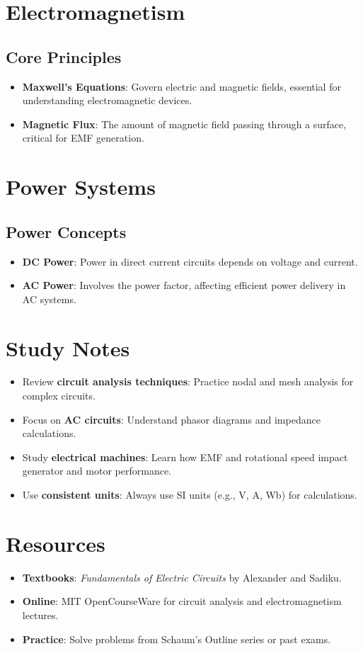 \documentclass[12pt]{article}
\newcommand{\concept}[1]{\textbf{#1}}
\begin{document}
\section{Electromagnetism}
\subsection{Core Principles}
\begin{itemize}
    \item \concept{Maxwell's Equations}: Govern electric and magnetic fields, essential for understanding electromagnetic devices.
    \item \concept{Magnetic Flux}: The amount of magnetic field passing through a surface, critical for EMF generation.
\end{itemize}

\section{Power Systems}
\subsection{Power Concepts}
\begin{itemize}
    \item \concept{DC Power}: Power in direct current circuits depends on voltage and current.
    \item \concept{AC Power}: Involves the power factor, affecting efficient power delivery in AC systems.
\end{itemize}

\section{Study Notes}
\begin{itemize}
    \item Review \textbf{circuit analysis techniques}: Practice nodal and mesh analysis for complex circuits.
    \item Focus on \textbf{AC circuits}: Understand phasor diagrams and impedance calculations.
    \item Study \textbf{electrical machines}: Learn how EMF and rotational speed impact generator and motor performance.
    \item Use \textbf{consistent units}: Always use SI units (e.g., \si{\volt}, \si{\ampere}, \si{\weber}) for calculations.
\end{itemize}

\section{Resources}
\begin{itemize}
    \item \textbf{Textbooks}: \textit{Fundamentals of Electric Circuits} by Alexander and Sadiku.
    \item \textbf{Online}: MIT OpenCourseWare for circuit analysis and electromagnetism lectures.
    \item \textbf{Practice}: Solve problems from Schaum's Outline series or past exams.
\end{itemize}
\end{document}
